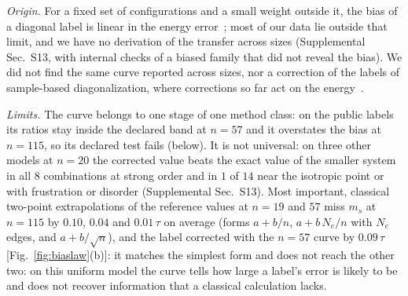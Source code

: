 \documentclass[aps,prx,twocolumn,10pt,superscriptaddress,nofootinbib,longbibliography,floatfix]{revtex4-2}
\theoremstyle{remark}
\newcommand{\ms}{m_s}
\begin{document}
\emph{Origin.} For a fixed set of configurations and a small weight outside it, the bias of a diagonal label is
linear in the energy error~\cite{white2007}; most of our data lie outside that limit, and we have no derivation
of the transfer across sizes (Supplemental Sec.~S13, with internal checks of a biased family that did not reveal
the bias). We did not find the same curve reported across sizes, nor a correction of the labels of sample-based
diagonalization, where corrections so far act on the energy~\cite{raisuddin2025}.

\emph{Limits.} The curve belongs to one stage of one method class: on the public labels its ratios stay inside the
declared band at $n=57$ and it overstates the bias at $n=115$, so its declared test fails (below). It is not
universal: on three other models at $n=20$ the corrected value beats the %
exact value of the smaller system in all $8$ combinations at strong order and in $1$ of $14$ near the isotropic point %
or with frustration or disorder (Supplemental Sec.~S13). Most important, classical
two-point extrapolations of the reference values at $n=19$ and $57$ miss $\ms$ at $n=115$ by $0.10$, $0.04$ and %
$0.01\,\tau$ on average (forms $a+b/n$, $a+b\,N_e/n$ with $N_e$ edges, and $a+b/\sqrt n$), and the label corrected %
with the $n=57$ curve by $0.09\,\tau$ [Fig.~\ref{fig:biaslaw}(b)]: it matches the simplest form and does not reach the %
other two: on this uniform model the curve tells how large a label's error is likely to be and does not recover
information that a classical calculation lacks.
\end{document}
